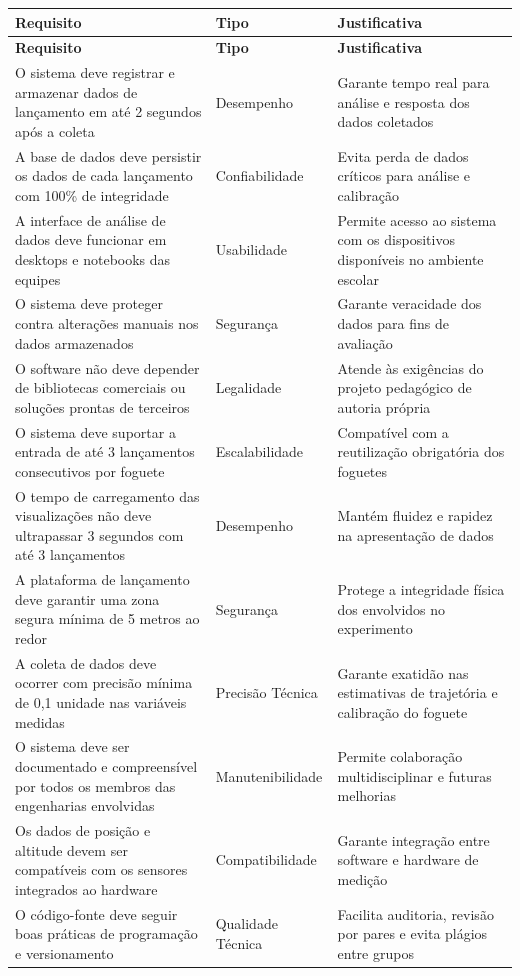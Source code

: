 \begin{longtable}{|p{5cm}|p{3cm}|p{7cm}|}


\hline
\textbf{Requisito} & \textbf{Tipo} & \textbf{Justificativa} \\
\hline
\endfirsthead

\hline
\textbf{Requisito} & \textbf{Tipo} & \textbf{Justificativa} \\
\hline
\endhead

O sistema deve registrar e armazenar dados de lançamento em até 2 segundos após a coleta & Desempenho & Garante tempo real para análise e resposta dos dados coletados \\
\hline
A base de dados deve persistir os dados de cada lançamento com 100\% de integridade & Confiabilidade & Evita perda de dados críticos para análise e calibração \\
\hline
A interface de análise de dados deve funcionar em desktops e notebooks das equipes & Usabilidade & Permite acesso ao sistema com os dispositivos disponíveis no ambiente escolar \\
\hline
O sistema deve proteger contra alterações manuais nos dados armazenados & Segurança & Garante veracidade dos dados para fins de avaliação \\
\hline
O software não deve depender de bibliotecas comerciais ou soluções prontas de terceiros & Legalidade & Atende às exigências do projeto pedagógico de autoria própria \\
\hline
O sistema deve suportar a entrada de até 3 lançamentos consecutivos por foguete & Escalabilidade & Compatível com a reutilização obrigatória dos foguetes \\
\hline
O tempo de carregamento das visualizações não deve ultrapassar 3 segundos com até 3 lançamentos & Desempenho & Mantém fluidez e rapidez na apresentação de dados \\
\hline
A plataforma de lançamento deve garantir uma zona segura mínima de 5 metros ao redor & Segurança & Protege a integridade física dos envolvidos no experimento \\
\hline
A coleta de dados deve ocorrer com precisão mínima de 0{,}1 unidade nas variáveis medidas & Precisão Técnica & Garante exatidão nas estimativas de trajetória e calibração do foguete \\
\hline
O sistema deve ser documentado e compreensível por todos os membros das engenharias envolvidas & Manutenibilidade & Permite colaboração multidisciplinar e futuras melhorias \\
\hline
Os dados de posição e altitude devem ser compatíveis com os sensores integrados ao hardware & Compatibilidade & Garante integração entre software e hardware de medição \\
\hline
O código-fonte deve seguir boas práticas de programação e versionamento & Qualidade Técnica & Facilita auditoria, revisão por pares e evita plágios entre grupos \\
\hline
\end{longtable}


